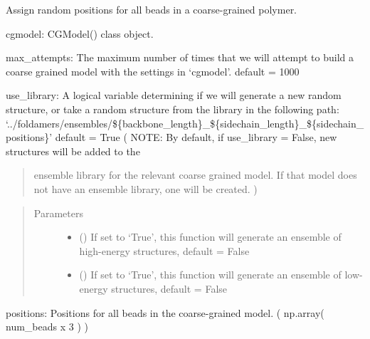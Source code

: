 \documentclass[letterpaper,12pt,english,openany,oneside]{sphinxmanual}
\begin{document}
\begin{fulllineitems}
\label{\detokenize{utilities:utilities.util.random_positions}}
Assign random positions for all beads in a coarse-grained polymer.

cgmodel: CGModel() class object.

max\_attempts: The maximum number of times that we will attempt to build
a coarse grained model with the settings in ‘cgmodel’.
default = 1000

use\_library: A logical variable determining if we will generate a new
random structure, or take a random structure from the library in the following path:
‘../foldamers/ensembles/\$\{backbone\_length\}\_\$\{sidechain\_length\}\_\$\{sidechain\_positions\}’
default = True
( NOTE: By default, if use\_library = False, new structures will be added to the
\begin{quote}

ensemble library for the relevant coarse grained model.  If that model does not
have an ensemble library, one will be created. )
\end{quote}
\begin{quote}\begin{description}
\item[{Parameters}] \leavevmode\begin{itemize}
\item {} 
 () \textendash{} If set to ‘True’, this function will generate an ensemble of high-energy structures, default = False

\item {} 
 () \textendash{} If set to ‘True’, this function will generate an ensemble of low-energy structures, default = False

\end{itemize}

\end{description}\end{quote}

positions: Positions for all beads in the coarse-grained model.
( np.array( num\_beads x 3 ) )

\end{fulllineitems}
\end{document}
